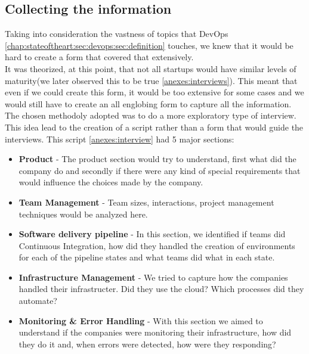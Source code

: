       \subsection{Collecting the information}
      Taking into consideration the vastness of topics that DevOps \ref{chap:stateoftheart:sec:devops:sec:definition} touches, we knew that it would be hard to create a form that covered that extensively.\\
      It was theorized, at this point, that not all startups would have similar levels of maturity(we later observed this to be true \ref{anexes:interviews}). This meant that even if we could create this form, it would be too extensive for some cases and we would still have to create an all englobing form to capture all the information. \\
      The chosen methodoly adopted was to do a more exploratory type of interview. This idea lead to the creation of a script rather than a form that would guide the interviews. This script \ref{anexes:interview} had 5 major sections:
      \begin{itemize}
          \item \textbf{Product} - The product section would try to understand, first what did the company do and secondly if there were any kind of special requirements that would influence the choices made by the company.
          \item \textbf{Team Management} - Team sizes, interactions, project management techniques would be analyzed here.
          \item \textbf{Software delivery pipeline} - In this section, we identified if teams did Continuous Integration, how did they handled the creation of environments for each of the pipeline states and what teams did what in each state.
          \item \textbf{Infrastructure Management} - We tried to capture how the companies handled their infrastructer. Did they use the cloud? Which processes did they automate?
          \item \textbf{Monitoring \& Error Handling} - With this section we aimed to understand if the companies were monitoring their infrastructure, how did they do it and, when errors were detected, how were they responding?
      \end{itemize}

